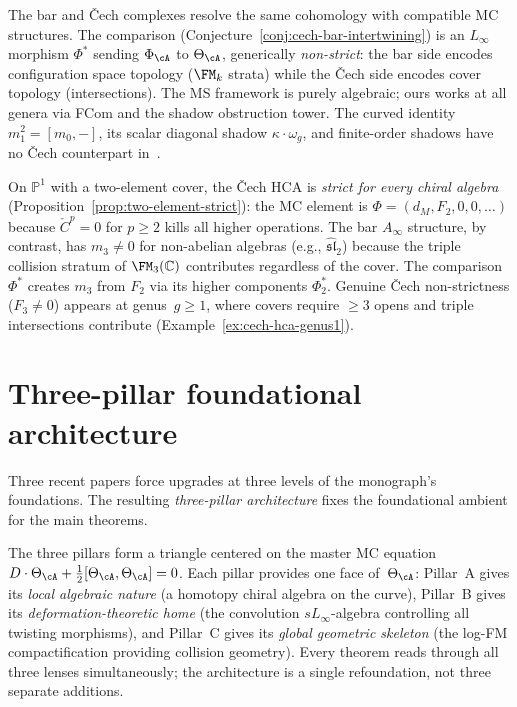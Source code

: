 \begin{remark}
\label{rem:ms-complementary}
The bar and \v{C}ech complexes resolve the same cohomology with
compatible MC structures. The comparison
(Conjecture~\ref{conj:cech-bar-intertwining}) is an $L_\infty$
morphism $\Phi^*$ sending $\Phi_\cA$ to $\Theta_\cA$, generically
\emph{non-strict}: the bar side encodes
configuration space topology ($\FM_k$ strata) while the \v{C}ech
side encodes cover topology (intersections). The MS framework is
purely algebraic; ours works at all genera via FCom and the shadow
obstruction tower. The curved identity $m_1^2=[m_0,-]$, its scalar
diagonal shadow $\kappa\cdot\omega_g$, and finite-order shadows have
no \v{C}ech counterpart in~\cite{MS24}.
\end{remark}

\begin{remark}
\label{rem:ms-genus0-agreement}
On $\mathbb{P}^1$ with a two-element cover, the \v{C}ech HCA is
\emph{strict for every chiral algebra}
(Proposition~\ref{prop:two-element-strict}): the MC element is
$\Phi = (d_M, F_2, 0, 0, \ldots)$ because $\check{C}^p = 0$ for
$p \geq 2$ kills all higher operations. The bar $A_\infty$
structure, by contrast, has $m_3 \neq 0$ for non-abelian algebras
(e.g., $\widehat{\mathfrak{sl}}_2$) because the triple collision
stratum of $\FM_3(\mathbb{C})$ contributes regardless of the cover.
The comparison $\Phi^*$ creates $m_3$ from $F_2$ via its higher
components $\Phi_2^*$. Genuine \v{C}ech non-strictness ($F_3 \neq 0$)
appears at genus~$g \geq 1$, where covers require $\geq 3$ opens and
triple intersections contribute
(Example~\ref{ex:cech-hca-genus1}).
\end{remark}

\section{Three-pillar foundational architecture}
\label{sec:concordance-three-pillars}

Three recent papers force upgrades at three levels of the
monograph's foundations. The resulting \emph{three-pillar
architecture} fixes the foundational ambient for the main theorems.

The three pillars form a triangle
centered on the master MC equation
$D\cdot\Theta_\cA + \tfrac{1}{2}[\Theta_\cA,\Theta_\cA] = 0$.
Each pillar provides one face of~$\Theta_\cA$: Pillar~A gives its
\emph{local algebraic nature} (a homotopy chiral algebra on the
curve), Pillar~B gives its \emph{deformation-theoretic home} (the
convolution $sL_\infty$-algebra controlling all twisting
morphisms), and Pillar~C gives its \emph{global geometric skeleton}
(the log-FM compactification providing collision geometry).
Every theorem reads through all three lenses
simultaneously; the architecture is a single
refoundation, not three separate additions.

